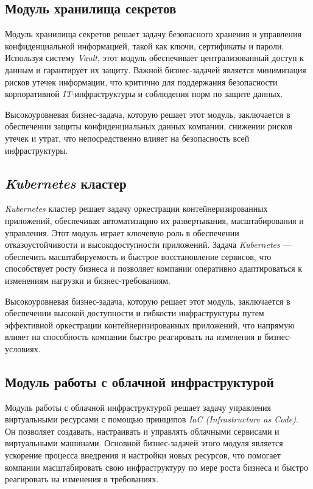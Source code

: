 \subsection{Модуль хранилища секретов} 
\label{sec:secrets_storage_module}

Модуль хранилища секретов решает задачу безопасного хранения и управления конфиденциальной информацией, такой как ключи, сертификаты и пароли. Используя систему \textit{Vault}, этот модуль обеспечивает централизованный доступ к данным и гарантирует их защиту. Важной бизнес-задачей является минимизация рисков утечек информации, что критично для поддержания безопасности корпоративной \textit{IT}-инфраструктуры и соблюдения норм по защите данных.

Высокоуровневая бизнес-задача, которую решает этот модуль, заключается в обеспечении защиты конфиденциальных данных компании, снижении рисков утечек и утрат, что непосредственно влияет на безопасность всей инфраструктуры.

\subsection{\textit{Kubernetes} кластер} 
\label{sec:kubernetes_cluster}

\textit{Kubernetes} кластер решает задачу оркестрации контейнеризированных приложений, обеспечивая автоматизацию их развертывания, масштабирования и управления. Этот модуль играет ключевую роль в обеспечении отказоустойчивости и высокодоступности приложений. Задача \textit{Kubernetes} — обеспечить масштабируемость и быстрое восстановление сервисов, что способствует росту бизнеса и позволяет компании оперативно адаптироваться к изменениям нагрузки и бизнес-требованиям.

Высокоуровневая бизнес-задача, которую решает этот модуль, заключается в обеспечении высокой доступности и гибкости инфраструктуры путем эффективной оркестрации контейнеризированных приложений, что напрямую влияет на способность компании быстро реагировать на изменения в бизнес-условиях.

\subsection{Модуль работы с облачной инфраструктурой} 
\label{sec:cloud_infrastructure_module}

Модуль работы с облачной инфраструктурой решает задачу управления виртуальными ресурсами с помощью принципов \textit{IaC (Infrastructure as Code)}. Он позволяет создавать, настраивать и управлять облачными сервисами и виртуальными машинами. Основной бизнес-задачей этого модуля является ускорение процесса внедрения и настройки новых ресурсов, что помогает компании масштабировать свою инфраструктуру по мере роста бизнеса и быстро реагировать на изменения в требованиях.

